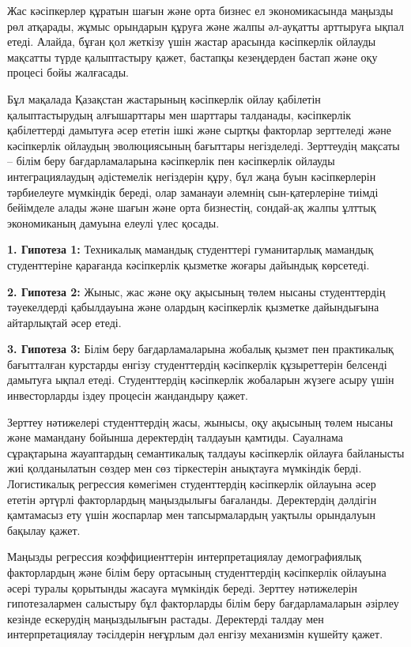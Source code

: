\begin{multicols}{2}
Жас кәсіпкерлер құратын шағын және орта бизнес ел экономикасында маңызды
рөл атқарады, жұмыс орындарын құруға және жалпы әл-ауқатты арттыруға
ықпал етеді. Алайда, бұған қол жеткізу үшін жастар арасында кәсіпкерлік
ойлауды мақсатты түрде қалыптастыру қажет, бастапқы кезеңдерден бастап
және оқу процесі бойы жалғасады.

Бұл мақалада Қазақстан жастарының кәсіпкерлік ойлау қабілетін
қалыптастырудың алғышарттары мен шарттары талданады, кәсіпкерлік
қабілеттерді дамытуға әсер ететін ішкі және сыртқы факторлар зерттеледі
және кәсіпкерлік ойлаудың эволюциясының бағыттары негізделеді.
Зерттеудің мақсаты -- білім беру бағдарламаларына кәсіпкерлік пен
кәсіпкерлік ойлауды интеграциялаудың әдістемелік негіздерін құру, бұл
жаңа буын кәсіпкерлерін тәрбиелеуге мүмкіндік береді, олар заманауи
әлемнің сын-қатерлеріне тиімді бейімделе алады және шағын және орта
бизнестің, сондай-ақ жалпы ұлттық экономиканың дамуына елеулі үлес
қосады.

  {\bfseries 1. Гипотеза 1:} Техникалық мамандық студенттері гуманитарлық
  мамандық студенттеріне қарағанда кәсіпкерлік қызметке жоғары дайындық
  көрсетеді.

  {\bfseries 2. Гипотеза 2:} Жыныс, жас және оқу ақысының төлем нысаны
  студенттердің тәуекелдерді қабылдауына және олардың кәсіпкерлік
  қызметке дайындығына айтарлықтай әсер етеді.

  {\bfseries 3. Гипотеза 3:} Білім беру бағдарламаларына жобалық қызмет пен
  практикалық бағытталған курстарды енгізу студенттердің кәсіпкерлік
  құзыреттерін белсенді дамытуға ықпал етеді. Студенттердің кәсіпкерлік
  жобаларын жүзеге асыру үшін инвесторларды іздеу процесін жандандыру
  қажет.

Зерттеу нәтижелері студенттердің жасы, жынысы, оқу ақысының төлем нысаны
және мамандану бойынша деректердің талдауын қамтиды. Сауалнама
сұрақтарына жауаптардың семантикалық талдауы кәсіпкерлік ойлауға
байланысты жиі қолданылатын сөздер мен сөз тіркестерін анықтауға
мүмкіндік берді. Логистикалық регрессия көмегімен студенттердің
кәсіпкерлік ойлауына әсер ететін әртүрлі факторлардың маңыздылығы
бағаланды. Деректердің дәлдігін қамтамасыз ету үшін жоспарлар мен
тапсырмалардың уақтылы орындалуын бақылау қажет.

Маңызды регрессия коэффициенттерін интерпретациялау демографиялық
факторлардың және білім беру ортасының студенттердің кәсіпкерлік
ойлауына әсері туралы қорытынды жасауға мүмкіндік береді. Зерттеу
нәтижелерін гипотезалармен салыстыру бұл факторларды білім беру
бағдарламаларын әзірлеу кезінде ескерудің маңыздылығын растады.
Деректерді талдау мен интерпретациялау тәсілдерін неғұрлым дәл енгізу
механизмін күшейту қажет.


\end{multicols}
